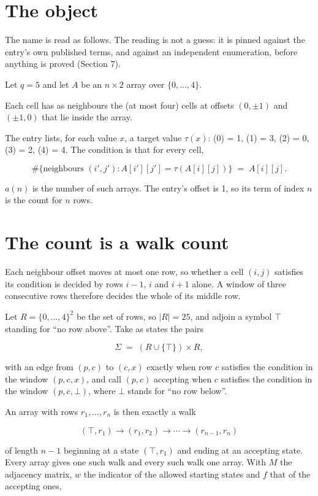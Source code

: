 \documentclass[11pt]{article}
\theoremstyle{definition}
\begin{document}
\section{The object}

The name is read as follows. The reading is not a guess: it is pinned against the entry's own published terms, and against an independent enumeration, before anything is proved (Section 7).

Let $q = 5$ and let $A$ be an $n \times 2$ array over $\{0,\dots,4\}$.

Each cell has as neighbours the (at most four) cells at offsets $(0,\pm1)$ and $(\pm1,0)$ that lie inside the array.

The entry lists, for each value $x$, a target value $\tau(x)$: \tau(0) = 1, \tau(1) = 3, \tau(2) = 0, \tau(3) = 2, \tau(4) = 4. The condition is that for every cell,

\[\#\{\text{neighbours } (i',j') : A[i'][j'] = \tau(A[i][j])\} \;=\; A[i][j].\]

$a(n)$ is the number of such arrays. The entry's offset is 1, so its term of index $n$ is the count for $n$ rows.

\section{The count is a walk count}

Each neighbour offset moves at most one row, so whether a cell $(i,j)$ satisfies its condition is decided by rows $i-1$, $i$ and $i+1$ alone. A window of three consecutive rows therefore decides the whole of its middle row.

Let $R = \{0,\dots,4\}^{2}$ be the set of rows, so $|R| = 25$, and adjoin a symbol $\top$ standing for ``no row above''. Take as states the pairs

\[\Sigma \;=\; (R \cup \{\top\}) \times R,\]

with an edge from $(p,c)$ to $(c,x)$ exactly when row $c$ satisfies the condition in the window $(p,c,x)$, and call $(p,c)$ accepting when $c$ satisfies the condition in the window $(p,c,\bot)$, where $\bot$ stands for ``no row below''.

An array with rows $r_1,\dots,r_n$ is then exactly a walk

\[(\top,r_1) \to (r_1,r_2) \to \cdots \to (r_{n-1},r_n)\]

of length $n-1$ beginning at a state $(\top,r_1)$ and ending at an accepting state. Every array gives one such walk and every such walk one array. With $M$ the adjacency matrix, $w$ the indicator of the allowed starting states and $f$ that of the accepting ones,
\end{document}

